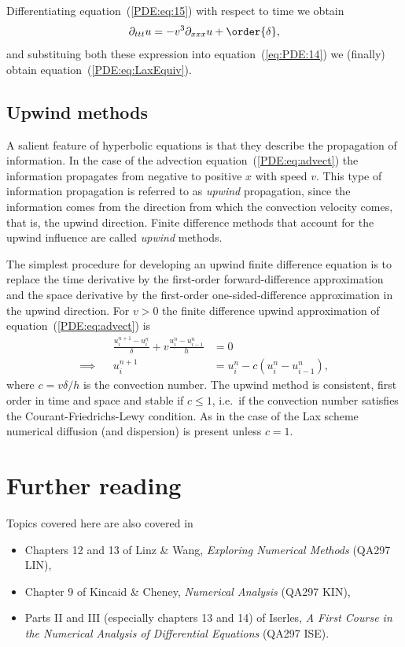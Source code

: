 %
Differentiating equation~(\ref{PDE:eq:15}) with respect to time we
obtain
%
\begin{equation*}
  \partial_{t t t} u = -v^3 \partial_{x x x} u + \order{\delta} ,
\end{equation*}
%
and substituing both these expression into equation~(\ref{eq:PDE:14})
we (finally) obtain equation~(\ref{PDE:eq:LaxEquiv}).

\subsection{Upwind methods}

A salient feature of hyperbolic equations is that they describe the
propagation of information.  In the case of the advection
equation~(\ref{PDE:eq:advect}) the information propagates from
negative to positive $x$ with speed $v$.  This type of information
propagation is referred to as \textit{upwind} propagation, since the
information comes from the direction from which the convection
velocity comes, that is, the upwind direction.  Finite difference
methods that account for the upwind influence are called
\textit{upwind} methods.

The simplest procedure for developing an upwind finite difference
equation is to replace the time derivative by the first-order
forward-difference approximation and the space derivative by the
first-order one-sided-difference approximation in the upwind
direction.  For $v > 0$ the finite difference upwind approximation of
equation~(\ref{PDE:eq:advect}) is
%
\begin{align}
  && \frac{u_{i}^{n+1}-u_{i}^{n}}{\delta} + v
  \frac{u_{i}^{n} - u_{i-1}^{n}}{h} &= 0 \\ \implies &&
  u_{i}^{n+1} &= u_{i}^{n} - c ( u_{i}^{n} - u_{i-1}^{n} ) ,
  \label{eq:PDE:Upw}
\end{align}
%
where $c=v \delta/h$ is the convection number.  The upwind method is
consistent, first order in time and space and stable if $c \le 1$,
i.e.\ if the convection number satisfies the Courant-Friedrichs-Lewy
condition.  As in the case of the Lax scheme numerical diffusion (and
dispersion) is present unless $c=1$.

\section*{Further reading}

Topics covered here are also covered in
\begin{itemize}
\item Chapters 12 and 13 of Linz \& Wang, \textit{Exploring Numerical
    Methods} (QA297 LIN),
\item Chapter 9 of Kincaid \& Cheney, \textit{Numerical Analysis}
  (QA297 KIN),
\item Parts II and III (especially chapters 13 and 14) of Iserles,
  \textit{A First Course in the Numerical Analysis of Differential
    Equations} (QA297 ISE).
\end{itemize}
